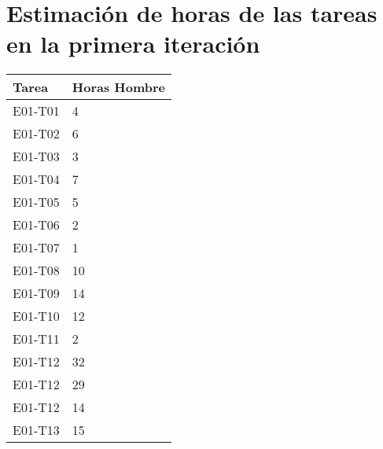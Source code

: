 \documentclass[a4paper, 11pt]{article}
\begin{document}
\section{Estimaci\'on de horas de las tareas en la primera iteraci\'on}
\begin{tabular}{| p{5cm} | p{5cm} |}

\hline
\bf{Tarea} & \bf{Horas Hombre} \\ \hline \hline
E01-T01 & 4 \\ \hline
E01-T02 & 6 \\ \hline
E01-T03 & 3 \\ \hline
E01-T04 & 7 \\ \hline
E01-T05 & 5 \\ \hline
E01-T06 & 2  \\ \hline
E01-T07 & 1 \\ \hline
E01-T08 & 10 \\ \hline
E01-T09 & 14 \\ \hline
E01-T10 & 12 \\ \hline
E01-T11 & 2 \\ \hline
E01-T12 & 32 \\ \hline
E01-T12 & 29 \\ \hline
E01-T12 & 14 \\ \hline
E01-T13 & 15 \\ \hline
\end{tabular}
\end{document}
